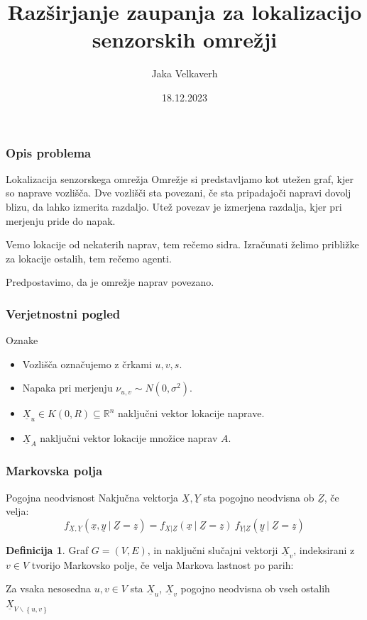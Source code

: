 \documentclass{beamer}
\title[Razširjanje zaupanja]{Razširjanje zaupanja za lokalizacijo senzorskih omrežji}
\author{Jaka Velkaverh}
\date{18.12.2023}
\theoremstyle{definition}
\newtheorem{definicija}{Definicija}
\begin{document}
	\frame{\titlepage}

	\begin{frame}
		\frametitle{Opis problema}
		\begin{block}{Lokalizacija senzorskega omrežja}
			Omrežje si predstavljamo kot utežen graf, kjer so naprave vozlišča.
			Dve vozlišči sta povezani, če sta pripadajoči napravi dovolj blizu,
			da lahko izmerita razdaljo. Utež povezav je izmerjena razdalja,
			kjer pri merjenju pride do napak.

			Vemo lokacije od nekaterih naprav, tem rečemo sidra. Izračunati
			želimo približke za lokacije ostalih, tem rečemo agenti.
		\end{block}
		Predpostavimo, da je omrežje naprav povezano.
	\end{frame}

	\begin{frame}
		\frametitle{Verjetnostni pogled}
		Oznake
		\begin{itemize}
			\item Vozlišča označujemo z črkami $u, v, s$.
			\item Napaka pri merjenju $\nu_{u, v} \sim N\left(0, \sigma^2\right)$.
			\item $\underline{X}_u \in K\left(0,R\right) \subseteq \mathbb{R}^n$ naključni vektor lokacije naprave.
			\item $\underline{X}_A$ naključni vektor lokacije množice naprav $A$.
		\end{itemize}
	\end{frame}

	\begin{frame}
		\frametitle{Markovska polja}
		\begin{block}{Pogojna neodvisnost}
			Nakjučna vektorja $\underline{X}, \underline{Y}$ sta pogojno
			neodvisna ob $\underline{Z}$, če velja:
			$$f_{\underline{X}, \underline{Y}}\left(\underline{x}, \underline{y}\ |\ \underline{Z} = \underline{z}\right) =
        f_{\underline{X}|\underline{Z}}\left(\underline{x}\ |\ \underline{Z} = \underline{z}\right) \
        f_{\underline{Y}|\underline{Z}}\left(\underline{y}\ |\ \underline{Z} = \underline{z}\right)
			$$
		\end{block}
		\pause
		\begin{definicija}
			Graf $G = \left(V, E\right)$, in naključni slučajni vektorji
			$\underline{X}_v$, indeksirani z $v \in V$ tvorijo Markovsko polje,
			če velja Markova lastnost po parih:

			Za vsaka nesosedna $u, v \in V$ sta $\underline{X}_u$, $\underline{X}_v$
			pogojno neodvisna ob vseh ostalih
			$\underline{X}_{V\backslash\left\{u, v\right\}}$
		\end{definicija}
	\end{frame}
\end{document}
